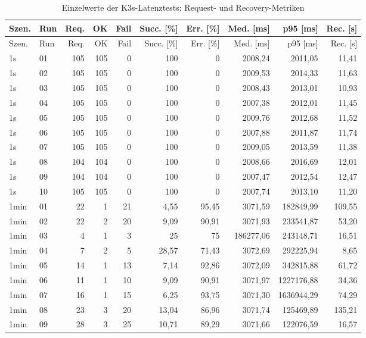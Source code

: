 \begin{longtable}{llrrrrrrrr}
\caption{Einzelwerte der K3s-Latenztests: Request- und Recovery-Metriken}\label{tab:appendix-k3s-latency-requests}\\
\toprule
Szen. & Run & Req. & OK & Fail & Succ. [\%] & Err. [\%] & Med. [ms] & p95 [ms] & Rec. [s] \\
\midrule
\endfirsthead
\toprule
Szen. & Run & Req. & OK & Fail & Succ. [\%] & Err. [\%] & Med. [ms] & p95 [ms] & Rec. [s] \\
\midrule
\endhead
1s & 01 & 105 & 105 & 0 & 100 & 0 & 2008,24 & 2011,05 & 11,41 \\
1s & 02 & 105 & 105 & 0 & 100 & 0 & 2009,53 & 2014,33 & 11,63 \\
1s & 03 & 105 & 105 & 0 & 100 & 0 & 2008,43 & 2013,01 & 10,93 \\
1s & 04 & 105 & 105 & 0 & 100 & 0 & 2007,38 & 2012,01 & 11,45 \\
1s & 05 & 105 & 105 & 0 & 100 & 0 & 2009,76 & 2012,68 & 11,52 \\
1s & 06 & 105 & 105 & 0 & 100 & 0 & 2007,88 & 2011,87 & 11,74 \\
1s & 07 & 105 & 105 & 0 & 100 & 0 & 2009,05 & 2013,59 & 11,38 \\
1s & 08 & 104 & 104 & 0 & 100 & 0 & 2008,66 & 2016,69 & 12,01 \\
1s & 09 & 104 & 104 & 0 & 100 & 0 & 2007,47 & 2012,54 & 12,47 \\
1s & 10 & 105 & 105 & 0 & 100 & 0 & 2007,74 & 2013,10 & 11,20 \\
1min & 01 & 22 & 1 & 21 & 4,55 & 95,45 & 3071,59 & 182849,99 & 109,55 \\
1min & 02 & 22 & 2 & 20 & 9,09 & 90,91 & 3071,93 & 233541,87 & 53,20 \\
1min & 03 & 4 & 1 & 3 & 25 & 75 & 186277,06 & 243148,71 & 16,51 \\
1min & 04 & 7 & 2 & 5 & 28,57 & 71,43 & 3072,69 & 292225,94 & 8,65 \\
1min & 05 & 14 & 1 & 13 & 7,14 & 92,86 & 3072,09 & 342815,88 & 61,72 \\
1min & 06 & 11 & 1 & 10 & 9,09 & 90,91 & 3071,97 & 1227176,88 & 34,36 \\
1min & 07 & 16 & 1 & 15 & 6,25 & 93,75 & 3071,30 & 1636944,29 & 74,29 \\
1min & 08 & 23 & 3 & 20 & 13,04 & 86,96 & 3071,74 & 125469,89 & 135,21 \\
1min & 09 & 28 & 3 & 25 & 10,71 & 89,29 & 3071,66 & 122076,59 & 16,57 \\

\end{longtable}
